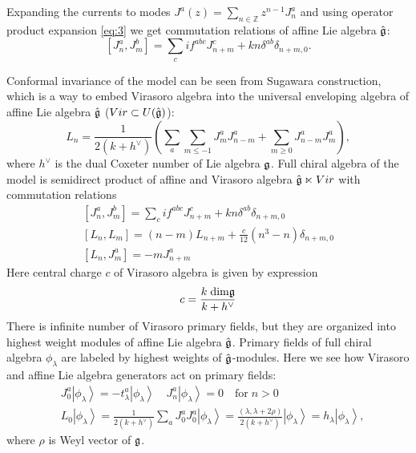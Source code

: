 Expanding the currents to modes
$J^a(z)=\sum\limits_{n\in \mathbb Z}z^{n-1}J^a_n $
and using operator product expansion \eqref{eq:3} we get commutation relations of affine Lie algebra $\hat{\mathfrak{g}}$:
\begin{equation*}
 \left[J^a_n,J^b_m\right]=\sum_c i f^{abc}J^c_{n+m}+kn\delta^{ab}\delta_{n+m,0}.  
\end{equation*}


Conformal invariance of the model can  be seen from 
Sugawara construction, which is a way to embed Virasoro algebra into the universal enveloping algebra of affine Lie algebra $\hat{\mathfrak{g}}$ ($Vir\subset U(\hat{\mathfrak{g}})$):
\begin{equation}
  \label{eq:4}
  L_n=\frac{1}{2(k+h^{\vee})}\left(\sum\limits_a\sum\limits_{m\leq -1}J^a_m J^a_{n-m}+\sum_{m\geq 0} J^{a}_{n-m}J^{a}_{m}\right), 
\end{equation}
 where $h^{\vee}$ is the dual Coxeter number of Lie algebra $\mathfrak{g}$. 
Full chiral algebra of the model is semidirect product of affine and Virasoro algebra $\hat{\mathfrak{g}} \ltimes Vir$ with commutation relations 
  \begin{equation}
    \label{eq:92}
    \begin{aligned}
      \left[J^a_n,J^b_m\right]=\sum_c i f^{abc}J^c_{n+m}+kn\delta^{ab}\delta_{n+m,0} \\
      \left[L_n,L_m\right]=(n-m)L_{n+m}+\frac{c}{12}(n^3-n)\delta_{n+m,0}\\
      \left[L_n,J^a_m\right]=-mJ^a_{n+m}
    \end{aligned}
  \end{equation}
Here central charge $c$ of Virasoro algebra is given by expression
\begin{equation}
  \label{eq:25}
  c=\frac{k\;\mathrm{dim}\mathfrak{g}}{k+h^{\vee}}
\end{equation}
There is infinite number of Virasoro primary fields, but they are organized into highest weight modules of affine Lie algebra $\hat{\mathfrak{g}}$. 
Primary fields of full chiral algebra $\phi_{\lambda}$ are labeled by highest weights of  $\hat{\mathfrak{g}}$-modules. Here we see how Virasoro and affine Lie algebra generators act on primary fields:
  \begin{equation*}
    \begin{aligned}
      & J_0^a\left|\phi_{\lambda}\right>=-t^a_{\lambda}\left|\phi_{\lambda}\right>  \quad    J^a_n\left|\phi_{\lambda}\right>=0 \quad \mbox{for}\; n>0 \\
      & L_0\left|\phi_{\lambda}\right>=\frac{1}{2(k+h^{\vee})}\sum_aJ^a_0J^a_0\left|\phi_{\lambda}\right>=\frac{(\lambda,\lambda+2\rho)}{2(k+h^{\vee})}\left|\phi_{\lambda}\right>=h_{\lambda} \left|\phi_{\lambda}\right>,
    \end{aligned}
  \end{equation*}
where $\rho$ is Weyl vector of $\mathfrak{g}$. 

